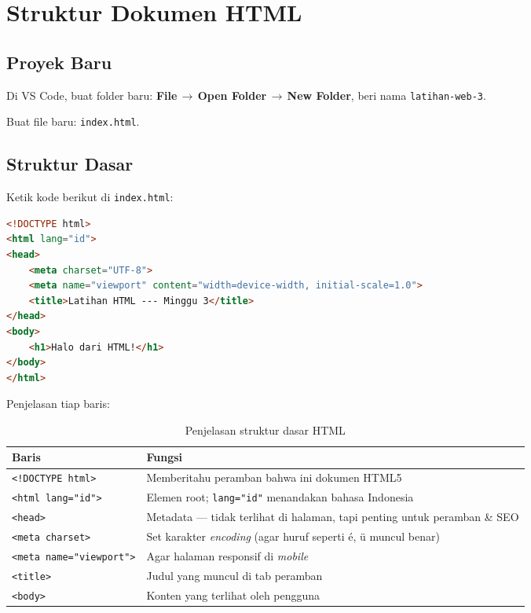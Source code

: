 \section{Struktur Dokumen HTML}
\label{sec:m03-struktur}

\subsection{Proyek Baru}

\begin{langkah}
  \item Di VS Code, buat folder baru: \textbf{File\,$\rightarrow$\,Open Folder\,$\rightarrow$\,New Folder}, beri nama \texttt{latihan-web-3}.
  \item Buat file baru: \texttt{index.html}.
\end{langkah}

\subsection{Struktur Dasar}

Ketik kode berikut di \texttt{index.html}:

\begin{lstlisting}[language=HTML, caption={Struktur dasar dokumen HTML}, label={lst:m03-struktur}]
<!DOCTYPE html>
<html lang="id">
<head>
    <meta charset="UTF-8">
    <meta name="viewport" content="width=device-width, initial-scale=1.0">
    <title>Latihan HTML --- Minggu 3</title>
</head>
<body>
    <h1>Halo dari HTML!</h1>
</body>
</html>
\end{lstlisting}

Penjelasan tiap baris:

\begin{table}[ht]
\centering
\caption{Penjelasan struktur dasar HTML}
\label{tab:m03-baris}
\begin{tabular}{p{4cm}p{8cm}}
\toprule
\textbf{Baris} & \textbf{Fungsi} \\
\midrule
\texttt{<!DOCTYPE html>} & Memberitahu peramban bahwa ini dokumen HTML5 \\
\texttt{<html lang="id">} & Elemen root; \texttt{lang="id"} menandakan bahasa Indonesia \\
\texttt{<head>} & Metadata --- tidak terlihat di halaman, tapi penting untuk peramban \& SEO \\
\texttt{<meta charset>} & Set karakter \emph{encoding} (agar huruf seperti é, ü muncul benar) \\
\texttt{<meta name="viewport">} & Agar halaman responsif di \emph{mobile} \\
\texttt{<title>} & Judul yang muncul di tab peramban \\
\texttt{<body>} & Konten yang terlihat oleh pengguna \\
\bottomrule
\end{tabular}
\end{table}

